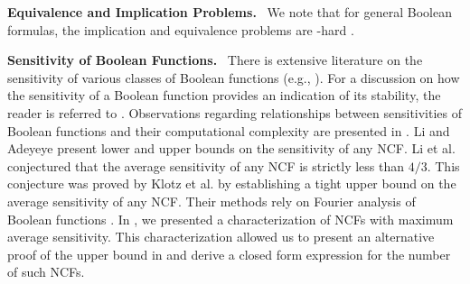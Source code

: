 \noindent
\textbf{Equivalence and Implication Problems.}~
We note that for general Boolean formulas, the implication and equivalence problems
are \cnp-hard \cite{GJ-1979}.

\bigskip

\noindent
\textbf{Sensitivity of Boolean Functions.}~
There is extensive literature on the sensitivity of various classes
of Boolean functions
(e.g., \cite{Buhrman-etal-2002,Nisan-etal-1994,Zhang-2011}).
For a discussion on how the sensitivity of a Boolean function provides
an indication of its stability, the reader is referred to \cite{Kauffman-etal-2004,
Layne-2011,Layne-etal-2012}.
Observations regarding relationships between sensitivities of Boolean functions
and their computational complexity are presented
in \cite{Buhrman-etal-2002,Nisan-etal-1994}.
Li and Adeyeye \cite{Li-etal-2012} present lower and upper bounds on the
sensitivity of any NCF.
Li et al. \cite{Li-etal-2011,Li-etal-2013} conjectured that the average
sensitivity of any NCF is strictly less than  $4/3$.
This conjecture was proved by Klotz et al. \cite{Klotz-etal-2013} by establishing
a tight upper bound on the average sensitivity of any NCF.
Their methods rely on Fourier analysis of Boolean functions
\cite{Odonnell-2014}.
In \cite{Stearns-etal-2018}, 
we presented a characterization of NCFs with maximum average sensitivity.
This characterization allowed us to present an alternative proof 
of the upper bound in \cite{Klotz-etal-2013} and derive a closed
form expression for the number of such NCFs.
